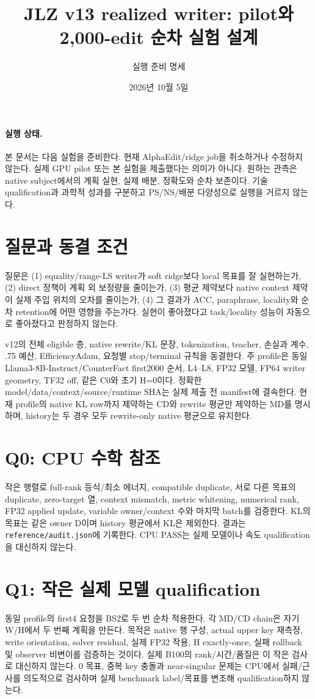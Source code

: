 \documentclass[11pt]{article}
\title{JLZ v13 realized writer: pilot와 2,000-edit 순차 실험 설계}
\author{실행 준비 명세}
\date{2026년 10월 5일}
\begin{document}
\maketitle

\paragraph{실행 상태.}
본 문서는 다음 실험을 준비한다. 현재 AlphaEdit/ridge job을 취소하거나 수정하지
않는다. 실제 GPU pilot 또는 본 실험을 제출했다는 의미가 아니다.
원하는 관측은 native subject에서의 계획 실현, 실제 배분, 정확도와 순차 보존이다.
기술 qualification과 과학적 성과를 구분하고 PS/NS/배분 다양성으로 실행을 거르지 않는다.

\section{질문과 동결 조건}
질문은 (1) equality/range-LS writer가 soft ridge보다 local 목표를 잘 실현하는가,
(2) direct 정책이 계획 외 보정량을 줄이는가,
(3) 평균 제약보다 native context 제약이 실제 주입 위치의 오차를 줄이는가,
(4) 그 결과가 ACC, paraphrase, locality와 순차 retention에 어떤 영향을 주는가다.
실현이 좋아졌다고 task/locality 성능이 자동으로 좋아졌다고 판정하지 않는다.

v12의 전체 eligible 층, native rewrite/KL 문장, tokenization, teacher,
손실과 계수, .75 예산, EfficiencyAdam, 요청별 stop/terminal 규칙을 동결한다.
주 profile은 동일 Llama3-8B-Instruct/CounterFact first2000 순서, L4--L8,
FP32 모델, FP64 writer geometry, TF32 off, 같은 C0와 초기 H=0이다.
정확한 model/data/context/source/runtime SHA는 실제 제출 전 manifest에 결속한다.
현재 profile의 native KL row까지 제약하는 CD와 rewrite 평균만 제약하는 MD를
명시하며, history는 두 경우 모두 rewrite-only native 평균으로 유지한다.

\section{Q0: CPU 수학 참조}
작은 행렬로 full-rank 등식/최소 에너지, compatible duplicate, 서로 다른 목표의
duplicate, zero-target 열, context mismatch, metric whitening, numerical rank,
FP32 applied update, variable owner/context 수와 마지막 batch를 검증한다.
KL의 목표는 같은 owner D이며 history 평균에서 KL은 제외한다.
결과는 \texttt{reference/audit.json}에 기록한다. CPU PASS는 실제 모델이나
속도 qualification을 대신하지 않는다.

\section{Q1: 작은 실제 모델 qualification}
동일 profile의 first4 요청을 BS2로 두 번 순차 적용한다. 각 MD/CD chain은
자기 W/H에서 두 번째 계획을 만든다. 목적은 native 행 구성, actual upper key
재측정, write orientation, solver residual, 실제 FP32 작용, H exactly-once,
실패 rollback 및 observer 비변이를 검증하는 것이다.
실제 B100의 rank/시간/품질은 이 작은 검사로 대신하지 않는다.
0 목표, 중복 key 충돌과 near-singular 문제는 CPU에서 실패/근사를 의도적으로
검사하며 실제 benchmark label/목표를 변조해 qualification하지 않는다.
\end{document}
